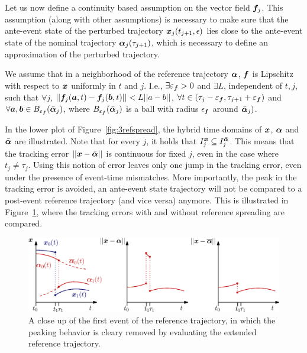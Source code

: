 \documentclass[../DC2017114Bouma.tex]{subfiles}
\begin{document}
Let us now define a continuity based assumption on the vector field ${\boldsymbol{f}}_j$. This assumption (along with other assumptions) is necessary to make sure that the ante-event state of the perturbed trajectory ${\boldsymbol{x}}_j(t_{j+1},\epsilon)$ lies close to the ante-event state of the nominal trajectory $\boldsymbol{\alpha}_j(\tau_{j+1})$, which is necessary to define an approximation of the perturbed trajectory.

\begin{myass}\label{ass:lipschitz}
We assume that in a neighborhood of the reference trajectory $\boldsymbol{\alpha}$, ${\boldsymbol{f}}$ is Lipschitz with respect to ${\boldsymbol{x}}$ uniformly in $t$ and $j$. I.e., $\exists\varepsilon_{{\boldsymbol{f}}}>0$ and $\exists L$, independent of $t,j$, such that $\forall j$, $||{\boldsymbol{f}}_j({\boldsymbol{a}},t) - {\boldsymbol{f}}_j({\boldsymbol{b}},t)||<L||a-b||$, $\forall t\in (\tau_j - \varepsilon_{{\boldsymbol{f}}},\tau_{j+1} + \varepsilon_{{\boldsymbol{f}}})$ and $\forall {\boldsymbol{a}},{\boldsymbol{b}}\in B_{\varepsilon_{{\boldsymbol{f}}}}(\bar{\boldsymbol{\alpha}}_j)$, where $B_{\varepsilon_{{\boldsymbol{f}}}}(\bar{\boldsymbol{\alpha}}_j)$ is a ball with radius $\epsilon_{{\boldsymbol{f}}}$ around $\bar{\boldsymbol{\alpha}}_j)$.
\end{myass}

In the lower plot of Figure~\ref{fig:3refspread}, the hybrid time domains of ${\boldsymbol{x}}$, $\boldsymbol{\alpha}$ and $\bar{\boldsymbol{\alpha}}$ are illustrated. Note that for every $j$, it holds that $I^{{\boldsymbol{x}}}_j\subseteq I^{\bar{\boldsymbol{\alpha}}}_j$. This means that the tracking error $||{\boldsymbol{x}}-\bar{\boldsymbol{\alpha}}||$ is continuous for fixed $j$, even in the case where $t_j\neq\tau_j$. Using this notion of error leaves only one jump in the tracking error, even under the presence of event-time mismatches. More importantly, the peak in the tracking error is avoided, an ante-event state trajectory will not be compared to a post-event reference trajectory (and vice versa) anymore. This is illustrated in Figure~\ref{fig:3refspreaderrors}, where the tracking errors with and without reference spreading are compared.

\begin{figure}[h]
\centering
\includegraphics[width=\textwidth]{refspreaderrors.eps}\caption{A close up of the  first event of the reference trajectory, in which the peaking behavior is cleary removed by evaluating the extended reference trajectory.} \label{fig:3refspreaderrors}
\end{figure}
\end{document}
